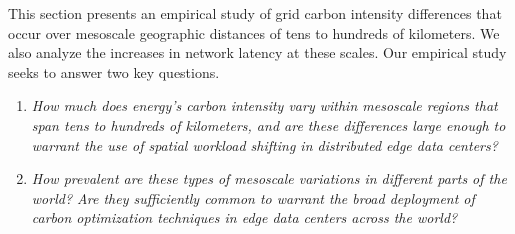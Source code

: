

This section presents an empirical study of grid carbon intensity differences that occur over mesoscale geographic distances of tens to hundreds of kilometers. We also analyze the increases in network latency at these scales. Our empirical study seeks to answer two key questions. 

\begin{enumerate}[leftmargin=*]
    \item {\em How much does energy's carbon intensity vary within mesoscale regions that span tens to hundreds of kilometers, and are these differences large enough to warrant the use of spatial workload shifting in distributed edge data centers?}
    
    \item {\em How prevalent are these types of mesoscale variations in different parts of the world? Are they sufficiently common to warrant the broad deployment of carbon optimization techniques in edge data centers across the world?}
\end{enumerate}





